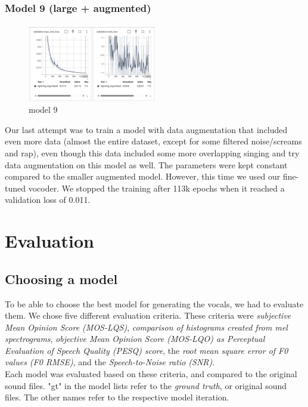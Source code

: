 \documentclass[a4paper]{article}
\begin{document}
	
	\subsubsection{Model 9 (large + augmented)}
	
	\begin{figure}[htbp]
		\centering
		\includegraphics[width=0.5\textwidth]{graphics/v9_testing.png}
		\caption{model 9}
		\label{fig:bild5}
	\end{figure}
	
	Our last attempt was to train a model with data augmentation that included even more data (almost the entire dataset, except for some filtered noise/screams and rap), even though this data included some more overlapping singing and try data augmentation on this model as well. The parameters were kept constant compared to the smaller augmented model. However, this time we used our fine-tuned vocoder. We stopped the training after 113k epochs when it reached a validation loss of 0.011.
	
	
	\section{Evaluation}
	
	\subsection{Choosing a model}
	
	To be able to choose the best model for generating the vocals, we had to
	evaluate them. We chose five different evaluation criteria. These criteria were
	\emph{subjective Mean Opinion Score (MOS-LQS)}, \emph{comparison of histograms
		created from mel spectrograms}, \emph{objective Mean Opinion Score (MOS-LQO) as
		Perceptual Evaluation of Speech Quality (PESQ) score}, the \emph{root mean
		square error of F0 values (F0 RMSE)}, and the \emph{Speech-to-Noise ratio
		(SNR)}. \\
	Each model was evaluated based on these criteria, and compared to the original
	sound files. "gt" in the model lists refer to the \emph{ground truth}, or
	original sound files. The other names refer to the respective model iteration.
	
\end{document}
